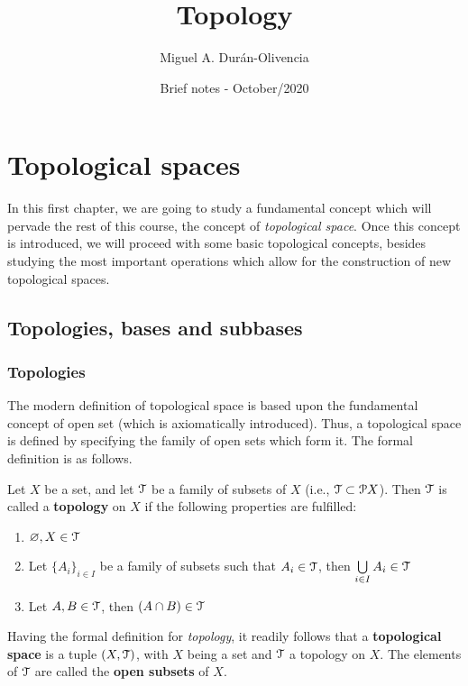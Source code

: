 \documentclass[12pt,spanish]{memoir}
\author{Miguel A. Dur\'{a}n-Olivencia}
\title{{\big Topology}}
\date{Brief notes - October/2020}
\begin{document}
\thispagestyle{empty}
\maketitle
\thispagestyle{empty}
\newpage

\frontmatter
\tableofcontents

\mainmatter
%
\chapter{Topological spaces}

In this first chapter, we are going to study a fundamental concept which will pervade the rest of this course, the concept of \emph{topological space}. Once this concept is introduced, we will proceed with some basic topological concepts, besides studying the most important operations which allow for the construction of new topological spaces.

\section{Topologies, bases and subbases}

\subsection{Topologies}
The modern definition of topological space is based upon the fundamental concept of open set (which is axiomatically introduced). Thus, a topological space is defined by specifying the family of open sets which form it.  The formal definition is as follows.

\begin{definition}
Let $X$ be a set, and let $\EuScript{T}$ be a family of subsets of $X$ (i.e., $\EuScript{T}\subset\EuScript{P} X$). Then $\EuScript{T}$ is called a \textbf{topology} on $X$ if the following properties are fulfilled:
\begin{enumerate}
	\item $\varnothing, X\in \EuScript{T}$
	\item Let $\{A_i\}_{i\in I}$ be a family of subsets such that $A_i \in \EuScript{T}$, then $\bigcup\limits_{i\in I} A_i\in\EuScript{T}$
	\item Let $A, B\in \EuScript{T}$, then $(A\cap B)\in \EuScript{T}$
\end{enumerate}
\label{def:topology}
\end{definition}

Having the formal definition for \emph{topology}, it readily follows that a \textbf{topological space} is a tuple $(X, \EuScript{T})$, with $X$ being a set and $\EuScript{T}$ a topology on $X$. The elements of $\EuScript{T}$ are called the \textbf{open subsets} of $X$. 
\end{document}
